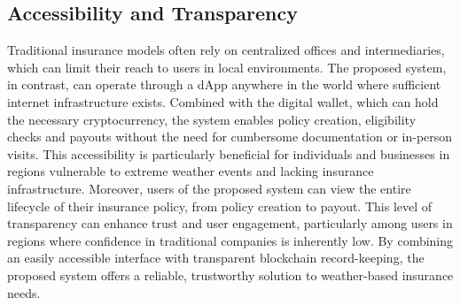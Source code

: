 \subsection{Accessibility and Transparency}\label{accessibility_transparency}
Traditional insurance models often rely on centralized offices and intermediaries, which can limit their reach to users in local environments. The proposed system, in contrast, can operate through a dApp anywhere in the world where sufficient internet infrastructure exists. Combined with the digital wallet, which can hold the necessary cryptocurrency, the system enables policy creation, eligibility checks and payouts without the need for cumbersome documentation or in-person visits. This accessibility is particularly beneficial for individuals and businesses in regions vulnerable to extreme weather events and lacking insurance infrastructure. Moreover, users of the proposed system can view the entire lifecycle of their insurance policy, from policy creation to payout. This level of transparency can enhance trust and user engagement, particularly among users in regions where confidence in traditional companies is inherently low. By combining an easily accessible interface with transparent blockchain record-keeping, the proposed system offers a reliable, trustworthy solution to weather-based insurance needs.